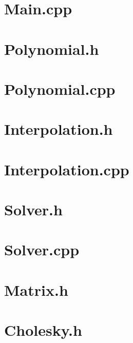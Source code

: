 \documentclass[journal,hidelinks]{IEEEtran}
\begin{document}
\begin{appendices}

\section{Main.cpp}
\label{sec:main}

\newpage

\section{Polynomial.h}
\label{sec:polynomial-h}

\newpage

\section{Polynomial.cpp}
\label{sec:polynomial-cpp}

\newpage

\section{Interpolation.h}
\label{sec:interpolation-h}

\newpage

\section{Interpolation.cpp}
\label{sec:interpolation-cpp}

\newpage

\section{Solver.h}
\label{sec:solver-h}

\newpage

\section{Solver.cpp}
\label{sec:solver-cpp}

\newpage

\section{Matrix.h}
\label{sec:matrix}

\newpage

\section{Cholesky.h}
\label{sec:cholesky}

\newpage


\end{appendices}
\end{document}

